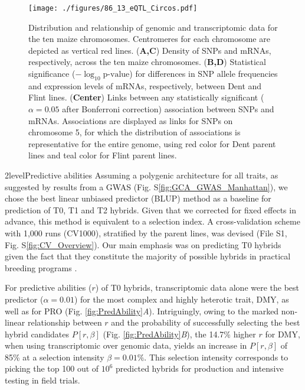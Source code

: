 \documentclass[12pt,titlepage]{article}
\begin{document}
\begin{figure}[H]
\centering
\texttt{[image: ./figures/86\_13\_eQTL\_Circos.pdf]}
\caption{
  Distribution and relationship of genomic and transcriptomic
  data for the ten maize chromosomes.
  Centromeres for each chromosome are depicted as vertical red lines.
  (\textbf{A,C}) Density of SNPs and mRNAs, respectively, across the ten maize
  chromosomes.
  (\textbf{B,D}) Statistical significance ($-\log_{10} \text{p-value}$) for
  differences in SNP allele frequencies and expression levels of mRNAs,
  respectively, between Dent and Flint lines.
  (\textbf{Center}) Links between any statistically significant
  ($\alpha = 0.05$ after Bonferroni correction) association between SNPs and
  mRNAs.
  Associations are displayed as links for SNPs on chromosome 5, for which the
  distribution of associations is representative for the entire genome, using 
  red color for Dent parent lines and teal color for Flint parent lines.
}
\label{fig:Circos}
\end{figure}



\Genetics2level{Predictive abilities}
Assuming a polygenic architecture for all traits, as suggested by results from
a GWAS (Fig. S\ref{fig:GCA_GWAS_Manhattan}), we chose the best linear unbiased
predictor (BLUP) method as a baseline for prediction of T0, T1 and T2 hybrids.
Given that we corrected for fixed effects in advance, this method is equivalent
to a selection index.
A cross-validation scheme with 1,000 runs (CV1000), stratified by the parent 
lines, was devised (File S1, Fig. S\ref{fig:CV_Overview}).
Our main emphasis was on predicting T0 hybrids given the fact that they 
constitute the majority of possible hybrids in practical breeding programs 
\cite{Kadam2016}.

For predictive abilities ($r$) of T0 hybrids, transcriptomic data alone were the
best predictor ($\alpha = 0.01$) for the most complex and highly heterotic
trait, DMY, as well as for PRO (Fig. \ref{fig:PredAbility}\textit{A}).
Intriguingly, owing to the marked non-linear relationship between $r$ and
the probability of successfully selecting the best hybrid candidates
$P[r, \beta]$ (Fig. \ref{fig:PredAbility}\textit{B}), the 14.7\% higher $r$ for
DMY, when using transcriptomic over genomic data, yields an increase in
$P[r, \beta]$ of 85\% at a selection intensity $\beta = 0.01\%$.
This selection intensity corresponds to picking the top 100 out of $10^{6}$ 
predicted hybrids for production and intensive testing in field trials.
\end{document}
